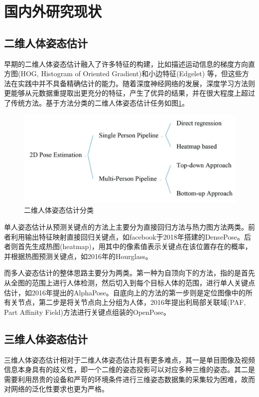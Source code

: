 \section{国内外研究现状}

\subsection{二维人体姿态估计}{}

早期的二维人体姿态估计融入了许多特征的构建，比如描述运动信息的梯度方向直方图(HOG, Histogram of Oriented Gradient)和小边特征(Edgelet)
等，但这些方法在实践中并不具备精确估计的能力。随着深度神经网络的发展，深度学习方法则更能够从元数据重提取出更充分的特征，产生了优异的结果，并在很大程度上超过了传统方法。基于方法分类的二维人体姿态估计任务如图\ref{fig:f5}。

\begin{figure}[h]
	\centering
	\includegraphics[scale=0.4]{figures/5.png}
	\caption{二维人体姿态估计分类}
	\label{fig:f5}
\end{figure}

单人姿态估计从预测关键点的方法上主要分为直接回归方法与热力图方法两类。前者利用输出特征映射直接回归关键点，如facebook于2018年搭建的DensePose。后者则首先生成热图(heatmap)，用其中的像素值表示关键点在该位置存在的概率，并根据热图预测关键点，如2016年的Hourglass。

而多人姿态估计的整体思路主要分为两类。第一种为自顶向下的方法，指的是首先从全图的范围上进行人体检测，然后切入到每个目标人体的范围，进行单人关键点估计，如2016年提出的AlphaPose。自底向上的方法的第一步则是定位图像中的所有关节点，第二步是将关节点向上分组为人体，2016年提出利局部关联域(PAF, Part Affinity Field)方法进行关键点组装的OpenPose。

\subsection{三维人体姿态估计}{}
三维人体姿态估计相对于二维人体姿态估计具有更多难点，其一是单目图像及视频信息本身具有的歧义性，即一个二维的姿态投影可以对应多种三维的姿态。其二是需要利用昂贵的设备和严苛的环境条件进行三维姿态数据集的采集较为困难，故而对网络的泛化性要求也更为严格。

